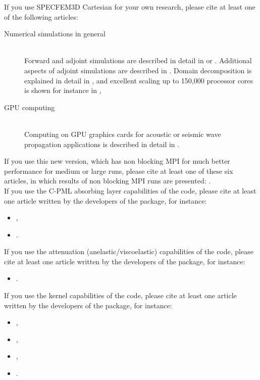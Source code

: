 If you use SPECFEM3D Cartesian for your own research, please cite
at least one of the following articles:
\begin{description}
\item [{Numerical simulations in general}] ~\\
 Forward and adjoint simulations are described in detail in \citet{TrKoLi08,PeKoLuMaLeCaLeMaLiBlNiBaTr11,VaCaSaKoVi99,KoMiEr09,KoErGoMi10,ChKoViCaVaFe07,MaKoDi09,KoViCh10,CaKoLaTiMiLeSnTr08,TrKoHjLiZhPeBoMcFrTrHu10,KoRiTr02,KoTr02a,KoTr02b,KoTr99}
or \citet{KoVi98}. Additional aspects of adjoint simulations are
described in \citet{TrTaLi05,LiTr06,TrKoLi08,LiTr08,TrKoHjLiZhPeBoMcFrTrHu10,PeKoLuMaLeCaLeMaLiBlNiBaTr11}.
Domain decomposition is explained in detail in \citet{MaKoBlLe08},
and excellent scaling up to 150,000 processor cores is shown for instance
in \citet{CaKoLaTiMiLeSnTr08,KoLaMi08a,MaKoBlLe08,KoErGoMi10,Kom11},
\item [{GPU computing}] ~\\
 Computing on GPU graphics cards for acoustic or seismic wave propagation
applications is described in detail in \citet{Kom11,MiKo10,KoMiEr09,KoErGoMi10}.
\end{description}
\noindent If you use this new version, which has non blocking
MPI for much better performance for medium or large runs, please cite
at least one of these six articles, in which results of non blocking
MPI runs are presented: \citet{PeKoLuMaLeCaLeMaLiBlNiBaTr11,KoErGoMi10,KoViCh10,Kom11,CaKoLaTiMiLeSnTr08,MaKoBlLe08}.\\

If you use the C-PML absorbing layer capabilities of the code, please cite at least one article
written by the developers of the package, for instance:
%
\begin{itemize}
\item \cite{XiKoMaMa14},
\item \cite{XiMaCrKoMa16}.
\end{itemize}
%
If you use the attenuation (anelastic/viscoelastic) capabilities of the code, please cite at least one article
written by the developers of the package, for instance:
%
\begin{itemize}
\item \cite{BlKoChLoXi16}.
\end{itemize}
%
If you use the kernel capabilities of the code, please cite at least one article
written by the developers of the package, for instance:
%
\begin{itemize}
\item \cite{TrKoLi08},
\item \cite{PeKoLuMaLeCaLeMaLiBlNiBaTr11},
\item \cite{LiTr06},
\item \cite{MoLuTr09}.
\end{itemize}

